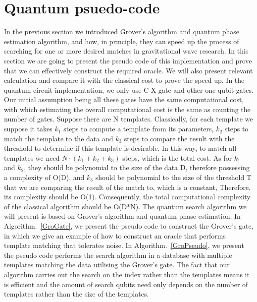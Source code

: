 \documentclass[aps,prd,nofootinbib,twocolumn,reprint,superscriptaddress,showpacs,showkeys,longbibliography]{revtex4-1}
\begin{document}
\section{Quantum psuedo-code}\label{sec:psuedocode}
In the previous section we introduced Grover's algorithm and quantum phase estimation algorithm, and how, in principle, they can speed up the process of searching for one or more desired matches in gravitational wave research. In this section we are going to present the pseudo code of this implementation and prove that we can effectively construct the required oracle. We will also present relevant calculation and compare it with the classical cost to prove the speed up.
\newline \newline In the quantum circuit implementation, we only use C-X gate and other one qubit gates. Our initial assumption being all these gates have the same computational cost, with which estimating the overall computational cost is the same as counting the number of gates. Suppose there are N templates. Classically, for each template we suppose it takes $k_1$ steps to compute a template from its parameters, $k_2$ steps to match the template to the data and $k_3$ steps to compare the result with the threshold to determine if this template is desirable. In this way, to match all templates we need $N \cdot (k_1+k_2+k_3)$ steps, which is the total cost. As for $k_1$ and $k_2$, they should be polynomial to the size of the data D, therefore possessing a complexity of O(D), and $k_3$ should be polynomial to the size of the threshold T that we are comparing the result of the match to, which is a constant, Therefore, its complexity should be O(1). Consequently, the total computational complexity of the classical algorithm should be O(D*N).  
\newline \newline The quantum search algorithm we will present is based on Grover's algorithm and quantum phase estimation. In Algorithm.~\ref{GroGate}, we present the pseudo code to construct the Grover's gate, in which we give an example of how to construct an oracle that performs template matching that tolerates noise. In Algorithm.~\ref{GroPseudo}, we present the pseudo code performs the search algorithm in a database with multiple templates matching the data utilising the Grover's gate. The fact that our algorithm carries out the search on the index rather than the templates means it is efficient and the amount of search qubits need only depends on the number of templates rather than the size of the templates.
\end{document}
